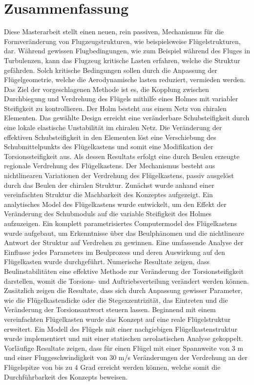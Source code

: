 \section*{Zusammenfassung}

Diese Masterarbeit stellt einen neuen, rein passiven, Mechanismus f\"ur die Formver\"anderung von Flug\-zeu\-gstrukturen, wie beispielsweise Fl\"ugelstrukturen, dar. W\"ahrend gewissen Flugbedingungen, wie zum Beispiel w\"ahrend des Fluges in Turbulenzen, kann das Flugzeug kritische Lasten erfahren, welche die Struktur gef\"ahrden. Solch kritische Bedingungen sollen durch die Anpassung der Fl\"ugelgeometrie, welche die Aerodynamische lasten reduziert, vermieden werden. Das Ziel der vorgeschlagenen Methode ist es, die Kopplung zwischen Durchbiegung und Verdrehung des Fl\"ugels mithilfe eines Holmes mit variabler Steifigkeit zu kontrollieren. Der Holm besteht aus einem Netz von chiralen Elementen. Das gew\"ahlte Design erreicht eine ver\"anderbare Schubsteifigkeit durch eine lokale elastische Unstabilit\"at im chiralen Netz. Die Ver\"anderung der effektiven Schubsteifigkeit in den Elementen l\"ost eine Verschiebung des Schubmittelpunkts des Fl\"ugelkastens und somit eine Modifikation der Torsionssteifigkeit aus. Als dessen Resultats erfolgt eine durch Beulen erzeugte regionale Verdrehung des Fl\"ugelkastens. Der Mechanismus besteht aus nichtlinearen Variationen der Verdrehung des Fl\"ugelkastens, passiv ausgel\"ost durch das Beulen der chiralen Struktur. Zun\"achst wurde anhand einer vereinfachten Struktur die Machbarkeit des Konzeptes aufgezeigt. Ein analytisches Model des Fl\"ugelkastens wurde entwickelt, um den Effekt der Ver\"anderung des Schubmoduls auf die variable Steifigkeit des Holmes aufzuzeigen.  Ein komplett parametrisiertes Computermodel des Fl\"ugelkastens wurde aufgebaut, um Erkenntnisse \"uber das Beulph\"anomen und die nichtlineare Antwort der Struktur auf Verdrehen zu gewinnen. Eine umfassende Analyse der Einflusse jedes Parameters im Beulprozess und deren Auswirkung auf den Fl\"ugelkasten wurde durchgef\"uhrt. Numerische Resultate zeigen, dass Beulinstabilit\"aten eine effektive Methode zur Ver\"anderung der Torsionsteifigkeit darstellen, womit die Torsions- und Auftriebsverteilung ver\"andert werden k\"onnen. Zus\"atzlich zeigen die Resultate, dass sich durch Anpassung gewisser Parameter, wie die Fl\"ugelkastendicke oder die Stegexzentrizit\"at, das Eintreten und die Ver\"anderung der Torsionsantwort steuern lassen. Beginnend mit einem vereinfachten Fl\"ugelkasten wurde das Konzept auf eine reale Fl\"ugelstruktur erweitert. Ein Modell des Fl\"ugels mit einer nachgiebigen Fl\"ugelkastenstruktur wurde implementiert und mit einer statischen aerolastischen Analyse gekoppelt. Vorl\"aufige Resultate zeigen, dass f\"ur einen Fl\"ugel mit einer Spannweite von 3 m und einer Fluggeschwindigkeit von 30 m/s Ver\"anderungen der Verdrehung an der Fl\"ugelspitze von bis zu 4 Grad erreicht werden k\"onnen, welche somit die Durchf\"uhrbarkeit des Konzepts beweisen.

